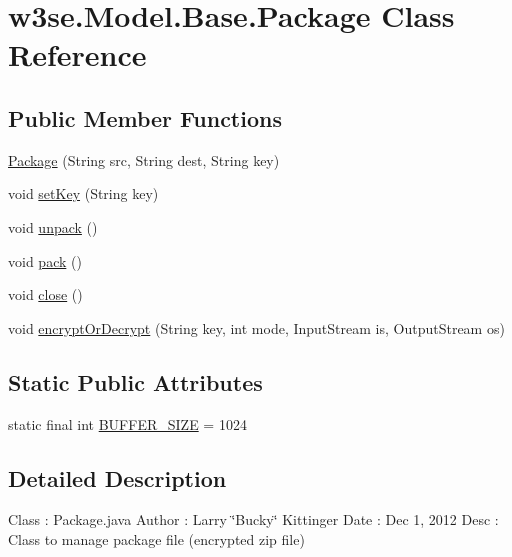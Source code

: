 \hypertarget{classw3se_1_1_model_1_1_base_1_1_package}{\section{w3se.\-Model.\-Base.\-Package Class Reference}
\label{classw3se_1_1_model_1_1_base_1_1_package}
}
\subsection*{Public Member Functions}
\begin{DoxyCompactItemize}
\item 
\hyperlink{classw3se_1_1_model_1_1_base_1_1_package_a4d235d15df75f83348b32cbf0c30e042}{Package} (String src, String dest, String key)
\item 
void \hyperlink{classw3se_1_1_model_1_1_base_1_1_package_a8cb0864f00050aa24496e30573bb918d}{set\-Key} (String key)
\item 
void \hyperlink{classw3se_1_1_model_1_1_base_1_1_package_a23d06b2ff69bfdcdb4b140caadbf1c79}{unpack} ()
\item 
void \hyperlink{classw3se_1_1_model_1_1_base_1_1_package_a42db2524c0e25afd8007860899396df2}{pack} ()
\item 
void \hyperlink{classw3se_1_1_model_1_1_base_1_1_package_a6af0ae65b63206e1b3ece3ae22baa44b}{close} ()
\item 
void \hyperlink{classw3se_1_1_model_1_1_base_1_1_package_a8ea47096e8de8db66599c7f783e78a5e}{encrypt\-Or\-Decrypt} (String key, int mode, Input\-Stream is, Output\-Stream os)
\end{DoxyCompactItemize}
\subsection*{Static Public Attributes}
\begin{DoxyCompactItemize}
\item 
static final int \hyperlink{classw3se_1_1_model_1_1_base_1_1_package_a35b2be04e88929ac78c70485e08eb784}{B\-U\-F\-F\-E\-R\-\_\-\-S\-I\-Z\-E} = 1024
\end{DoxyCompactItemize}


\subsection{Detailed Description}
Class \-: Package.\-java Author \-: Larry \char`\"{}\-Bucky\char`\"{} Kittinger Date \-: Dec 1, 2012 Desc \-: Class to manage package file (encrypted zip file) 

